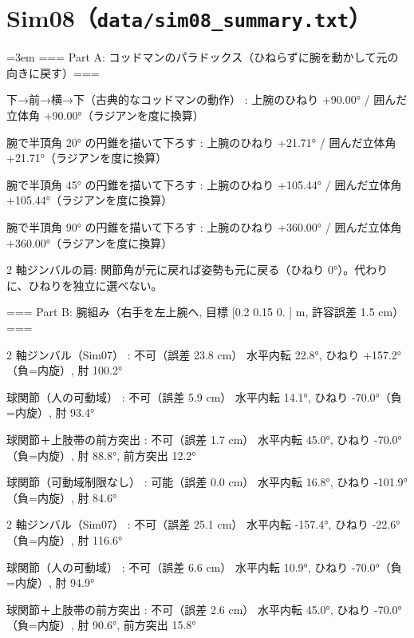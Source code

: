 \section{Sim08（\texttt{data/sim08\_summary.txt}）}
{\footnotesize\raggedright\sloppy\setlength{\parindent}{0pt}\setlength{\parskip}{0pt}\emergencystretch=3em
=== Part A: コッドマンのパラドックス（ひねらずに腕を動かして元の向きに戻す）===\par
  下→前→横→下（古典的なコッドマンの動作）       : 上腕のひねり  +90.00°  / 囲んだ立体角  +90.00°（ラジアンを度に換算）\par
  腕で半頂角 20° の円錐を描いて下ろす        : 上腕のひねり  +21.71°  / 囲んだ立体角  +21.71°（ラジアンを度に換算）\par
  腕で半頂角 45° の円錐を描いて下ろす        : 上腕のひねり +105.44°  / 囲んだ立体角 +105.44°（ラジアンを度に換算）\par
  腕で半頂角 90° の円錐を描いて下ろす        : 上腕のひねり +360.00°  / 囲んだ立体角 +360.00°（ラジアンを度に換算）\par
  2 軸ジンバルの肩: 関節角が元に戻れば姿勢も元に戻る（ひねり 0°）。代わりに、ひねりを独立に選べない。\par
\mbox{}\par
=== Part B: 腕組み（右手を左上腕へ, 目標 [0.2  0.15 0.  ] m, 許容誤差 1.5 cm）===\par
  [細身 (奥行 0.18 m)  ] 2 軸ジンバル（Sim07）      : 不可（誤差  23.8 cm）  水平内転  22.8°, ひねり +157.2°（負=内旋）, 肘 100.2°\par
  [細身 (奥行 0.18 m)  ] 球関節（人の可動域）          : 不可（誤差   5.9 cm）  水平内転  14.1°, ひねり  -70.0°（負=内旋）, 肘  93.4°\par
  [細身 (奥行 0.18 m)  ] 球関節＋上肢帯の前方突出        : 不可（誤差   1.7 cm）  水平内転  45.0°, ひねり  -70.0°（負=内旋）, 肘  88.8°, 前方突出 12.2°\par
  [細身 (奥行 0.18 m)  ] 球関節（可動域制限なし）        : 可能（誤差   0.0 cm）  水平内転  16.8°, ひねり -101.9°（負=内旋）, 肘  84.6°\par
  [標準 (0.22 m)     ] 2 軸ジンバル（Sim07）      : 不可（誤差  25.1 cm）  水平内転 -157.4°, ひねり  -22.6°（負=内旋）, 肘 116.6°\par
  [標準 (0.22 m)     ] 球関節（人の可動域）          : 不可（誤差   6.6 cm）  水平内転  10.9°, ひねり  -70.0°（負=内旋）, 肘  94.9°\par
  [標準 (0.22 m)     ] 球関節＋上肢帯の前方突出        : 不可（誤差   2.6 cm）  水平内転  45.0°, ひねり  -70.0°（負=内旋）, 肘  90.6°, 前方突出 15.8°\par
}
